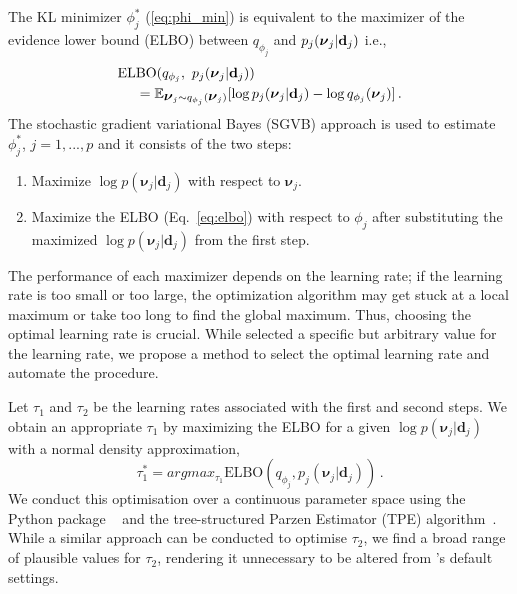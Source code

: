 \documentclass[%
 reprint,
 amsmath,amssymb,
 aps,
 nofootinbib,
]{revtex4-2}
\begin{document}
The KL minimizer $\phi^*_j$ (\ref{eq:phi_min}) is equivalent to the maximizer of the evidence lower bound (ELBO) between $q_{\phi_j}$ and $p_j(\mbox{\boldmath $\nu$}_j|{\bf d}_j)$ i.e.,  
\begin{align}\label{eq:elbo}
\text{EL}&\text{BO}(q_{\phi_j},\ p_j(\mbox{\boldmath $\nu$}_j|{\bf d}_j))  \nonumber \\
&=\mathbb{E}_{\mbox{\boldmath $\nu$}_j\sim q_{\phi_j}(\mbox{\boldmath $\nu$}_j)}[\log p_j(\mbox{\boldmath $\nu$}_j|{\bf d}_j)-\log q_{\phi_j}(\mbox{\boldmath $\nu$}_j)] \,.    
\end{align}
The stochastic gradient variational Bayes (SGVB) approach is used to estimate $\phi^*_j$, $j=1,...,p$ and it consists of the two steps:
\begin{enumerate}
    \item Maximize $\log p(\boldsymbol{\nu}_j|\mathbf{d}_j)$ with respect to $\boldsymbol{\nu}_j$.
    \item Maximize the ELBO (Eq.~\ref{eq:elbo}) with respect to $\phi_j$ after substituting the maximized $\log p(\boldsymbol{\nu}_j|\mathbf{d}_j)$ from the first step.
 \end{enumerate}

The performance of each maximizer depends on the learning rate; if the learning rate is too small or too large, the optimization algorithm may get stuck at a local maximum or take too long to find the global maximum. 
Thus, choosing the optimal learning rate is crucial.
While \citet{Hu2023} selected a specific but arbitrary value for the learning rate, we propose a method to select the optimal learning rate and automate the procedure.

Let $\tau_1$ and $\tau_2$ be the learning rates associated with the first and second steps. 
We obtain an appropriate $\tau_1$ by maximizing the ELBO for a given $\log p(\boldsymbol{\nu}_j|\mathbf{d}_j)$ with a normal density approximation,
\begin{equation}
\tau_1^* = argmax_{\tau_1} \text{ELBO}(q_{\phi_j}, p_j(\boldsymbol{\nu}_j|\mathbf{d}_j)) \,.    
\end{equation}
We conduct this optimisation over a continuous parameter space using the Python package \hyperopt~\cite{Bergstra2013} and the tree-structured Parzen Estimator (TPE) algorithm~\citeme. 
While a similar approach can be conducted to optimise $\tau_2$, we find a broad range of plausible values for $\tau_2$, rendering it unnecessary to be altered from \citet{Hu2023}'s default settings.
\end{document}
